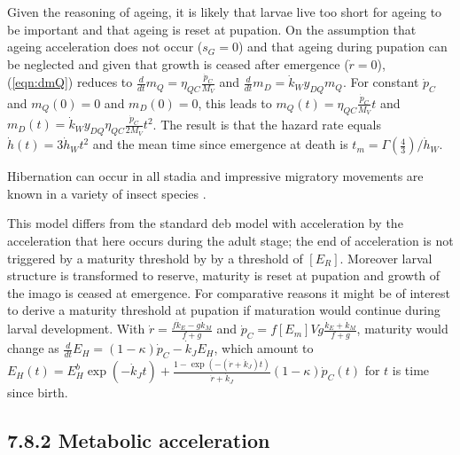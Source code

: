 Given the reasoning of ageing, it is likely that larvae live too short for ageing to be important and that ageing is reset at pupation.
On the assumption that ageing acceleration does not occur ($s_G = 0$) and that ageing during pupation can be neglected and given that growth is ceased after emergence ($\dot{r} = 0$), (\ref{eqn:dmQ}) reduces to $\frac{d} {dt} m_Q = \eta_{QC} \frac{\dot{p}_C} {M_V}$ and $\frac{d} {dt} m_D = \dot{k}_W y_{DQ} m_Q$.
For constant $\dot{p}_C$ and $m_Q(0) = 0$ and $m_D(0) = 0$, this leads to $m_Q(t) = \eta_{QC} \frac{\dot{p}_C} {M_V} t$ and $m_D(t) = \dot{k}_W y_{DQ} \eta_{QC} \frac{\dot{p}_C} {2 M_V} t^2$.
The result is that the hazard rate equals $\dot{h}(t) = 3 \dot{h}_W t^2$ and the mean time since emergence at death is $t_m = \Gamma(\frac{4} {3})/ \dot{h}_W$.

Hibernation can occur in all stadia and impressive migratory movements are known in a variety of insect species \cite{Lemp72}.

This model differs from the standard {\sc deb} model with acceleration by the acceleration that here occurs during the adult stage; the end of acceleration is not triggered by a maturity threshold by by a threshold of $[E_R]$.
Moreover larval structure is transformed to reserve, maturity is reset at pupation and growth of the imago is ceased at emergence.
For comparative reasons it might be of interest to derive a maturity threshold at pupation if maturation would continue during larval development.
With $\dot{r} = \frac{f \dot{k}_E - g \dot{k}_M} {f + g}$ and $\dot{p}_C = f [E_m] V g \frac{\dot{k}_E + \dot{k}_M} {f + g}$, maturity would change as $\frac{d} {dt} E_H = (1 - \kappa) \dot{p}_C - \dot{k}_J E_H$, which amount to $E_H(t) = E_H^b \exp(-\dot{k}_J t) + \frac{1 - \exp(- (\dot{r} + \dot{k}_J) t)} {\dot{r} + \dot{k}_J} (1 - \kappa) \dot{p}_C(t)$ for $t$ is time since birth.

\subsection*{7.8.2 Metabolic acceleration}
{}
\label{ssec_c:acceleration}

